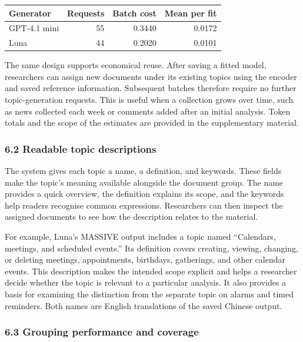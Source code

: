 \documentclass[
  11pt,
  a4paper,
]{article}
\newcounter{none} %
\begin{document}
{\def\LTcaptype{none} %
\begin{longtable}[]{@{}lrrr@{}}
\toprule\noalign{}
Generator & Requests & Batch cost & Mean per fit \\
\midrule\noalign{}
\endhead
\bottomrule\noalign{}
\endlastfoot
GPT-4.1 mini & 55 & 0.3440 & 0.0172 \\
Luna & 44 & 0.2020 & 0.0101 \\
\end{longtable}
}

The same design supports economical reuse. After saving a fitted model,
researchers can assign new documents under its existing topics using the
encoder and saved reference information. Subsequent batches therefore
require no further topic-generation requests. This is useful when a
collection grows over time, such as news collected each week or comments
added after an initial analysis. Token totals and the scope of the
estimates are provided in the supplementary material.

\subsubsection{6.2 Readable topic
descriptions}\label{readable-topic-descriptions}

The system gives each topic a name, a definition, and keywords. These
fields make the topic's meaning available alongside the document group.
The name provides a quick overview, the definition explains its scope,
and the keywords help readers recognise common expressions. Researchers
can then inspect the assigned documents to see how the description
relates to the material.

For example, Luna's MASSIVE output includes a topic named ``Calendars,
meetings, and scheduled events.'' Its definition covers creating,
viewing, changing, or deleting meetings, appointments, birthdays,
gatherings, and other calendar events. This description makes the
intended scope explicit and helps a researcher decide whether the topic
is relevant to a particular analysis. It also provides a basis for
examining the distinction from the separate topic on alarms and timed
reminders. Both names are English translations of the saved Chinese
output.

\subsubsection{6.3 Grouping performance and
coverage}\label{grouping-performance-and-coverage}
\end{document}
